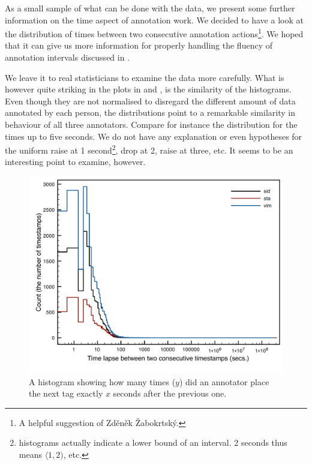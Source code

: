 As a small sample of what can be done with the data, we present some further information on the time aspect of annotation work. We decided to have a look at the distribution of times between two consecutive annotation actions\footnote{A helpful suggestion of Zděněk Žabokrtský.}. We hoped that it can give us more information for properly handling the fluency of annotation intervals discussed in . 

We leave it to real statisticians to examine the data more carefully. What is however quite striking in the plots in  and , is the similarity of the histograms. Even though they are not normalised to disregard the different amount of data annotated by each person, the distributions point to a remarkable similarity in behaviour of all three annotators. Compare for instance the distribution for the times up to five seconds. We do not have any explanation or even hypotheses for the uniform raise at 1 second\footnote{histograms actually indicate a lower bound of an interval. 2 seconds thus means $\langle1, 2)$, etc.}, drop at 2, raise at three, etc. It seems to be an interesting point to examine, however.

\begin{figure}[htbp]
   \centering
   \includegraphics[width=.8\textwidth]{images/speed/histograms} 
   \caption{A histogram showing how many times ($y$) did an annotator place the next tag exactly $x$ seconds after the previous one.} 
   \label{fig:hist}
\end{figure}

